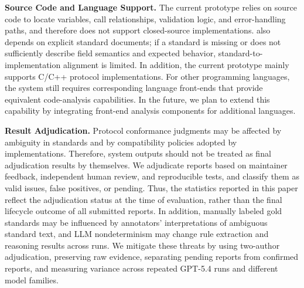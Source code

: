 \noindent \textbf{Source Code and Language Support.}
The current prototype relies on source code to locate variables, call
relationships, validation logic, and error-handling paths, and therefore does
not support closed-source implementations. \tool{} also depends on explicit
standard documents; if a standard is missing or does not sufficiently describe
field semantics and expected behavior, standard-to-implementation alignment is
limited. In addition, the current prototype mainly supports C/C++ protocol
implementations. For other programming languages, the system still requires
corresponding language front-ends that provide equivalent code-analysis
capabilities. In the future, we plan to extend this capability by integrating
front-end analysis components for additional languages.

\noindent \textbf{Result Adjudication.}
Protocol conformance judgments may be affected by ambiguity in standards and by
compatibility policies adopted by implementations. Therefore, system outputs
should not be treated as final adjudication results by themselves. We adjudicate
reports based on maintainer feedback, independent human review, and reproducible
tests, and classify them as valid issues, false positives, or pending. Thus, the
statistics reported in this paper reflect the adjudication status at the time of
evaluation, rather than the final lifecycle outcome of all submitted reports. In
addition, manually labeled gold standards may be influenced by annotators'
interpretations of ambiguous standard text, and LLM nondeterminism may change
rule extraction and reasoning results across runs. We mitigate these threats by
using two-author adjudication, preserving raw evidence, separating pending
reports from confirmed reports, and measuring variance across repeated GPT-5.4
runs and different model families.





